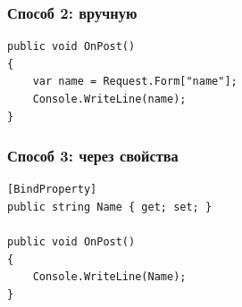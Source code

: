 \documentclass[xetex,mathserif,serif]{beamer}
\begin{document}
    \begin{frame}[fragile]
        \frametitle{Способ 2: вручную}
        \begin{small}
            \begin{verbatim}
public void OnPost()
{
    var name = Request.Form["name"];
    Console.WriteLine(name);
}
            \end{verbatim}
        \end{small}
    \end{frame}

    \begin{frame}[fragile]
        \frametitle{Способ 3: через свойства}
        \begin{small}
            \begin{verbatim}
[BindProperty]
public string Name { get; set; }

public void OnPost()
{
    Console.WriteLine(Name);
}
            \end{verbatim}
        \end{small}
    \end{frame}
\end{document}
